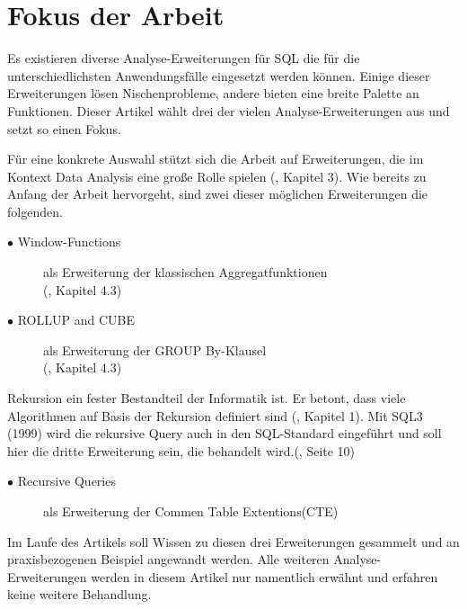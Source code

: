 \section{Fokus der Arbeit}
Es existieren diverse Analyse-Erweiterungen für SQL die für die unterschiedlichsten
Anwendungsfälle eingesetzt werden können. Einige dieser Erweiterungen lösen
Nischenprobleme, andere bieten eine breite Palette an Funktionen. Dieser Artikel
wählt drei der vielen Analyse-Erweiterungen aus und setzt so einen Fokus.

Für eine konkrete Auswahl stützt sich die Arbeit auf Erweiterungen, die im Kontext
Data Analysis eine große Rolle spielen (\cite{FOTACHE2015243}, Kapitel 3). Wie bereits
zu Anfang der Arbeit hervorgeht, sind zwei dieser möglichen Erweiterungen die
folgenden.

\begin{description}
	\item[$\bullet$ Window-Functions] als Erweiterung der klassischen Aggregatfunktionen
		\\ (\cite{FOTACHE2015243}, Kapitel 4.3)

	\item[$\bullet$ ROLLUP and CUBE] als Erweiterung der GROUP By-Klausel \\ (\cite{FOTACHE2015243},
		Kapitel 4.3)
\end{description}

Rekursion ein fester Bestandteil der Informatik ist. Er betont, dass viele Algorithmen
auf Basis der Rekursion definiert sind (\cite{4460710}, Kapitel 1). Mit SQL3 (1999)
wird die rekursive Query auch in den SQL-Standard eingeführt und soll hier die dritte
Erweiterung sein, die behandelt wird.(\cite{grust2017advanced}, Seite 10)

\begin{description}
	\item[$\bullet$ Recursive Queries] als Erweiterung der Commen Table Extentions(CTE)
\end{description}

Im Laufe des Artikels soll Wissen zu diesen drei Erweiterungen gesammelt und an praxisbezogenen
Beispiel angewandt werden. Alle weiteren Analyse-Erweiterungen werden in diesem
Artikel nur namentlich erwähnt und erfahren keine weitere Behandlung.